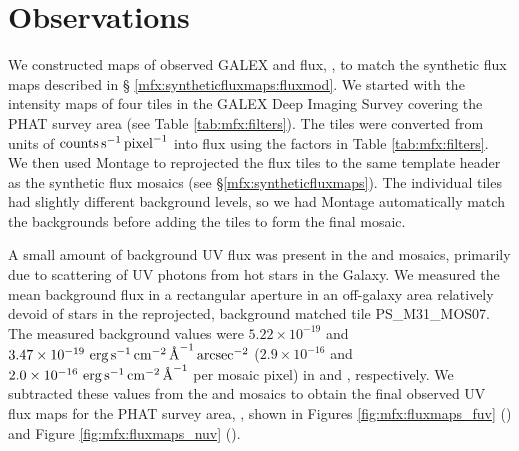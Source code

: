\section{Observations}\label{mfx:observations}

We constructed maps of observed GALEX \fuv{} and \nuv{} flux, \fxobs{}, to
match the synthetic flux maps described in \S
\ref{mfx:syntheticfluxmaps:fluxmod}. We started with the intensity maps of four
tiles in the GALEX Deep Imaging Survey \citep[DIS][]{Martin:2005} covering the
PHAT survey area (see Table \ref{tab:mfx:filters}). The tiles were converted
from units of $\mathrm{counts} \,\mathrm{s}^{-1} \,\mathrm{pixel}^{-1}$ into flux
using the factors in Table \ref{tab:mfx:filters}. We then used Montage to
reprojected the flux tiles to the same template header as the synthetic flux
mosaics (see \S \ref{mfx:syntheticfluxmaps}). The individual tiles had slightly
different background levels, so we had Montage automatically match the
backgrounds before adding the tiles to form the final mosaic.

A small amount of background UV flux was present in the \fuv{} and \nuv{}
mosaics, primarily due to scattering of UV photons from hot stars in the
Galaxy. We measured the mean background flux in a rectangular aperture in an
off-galaxy area relatively devoid of stars in the reprojected, background
matched tile PS\_M31\_MOS07. The measured background values were $5.22 \times
10^{-19}$ and $3.47 \times 10^{-19}\, \,\mathrm{erg}\,\mathrm{s}^{-1}\,\mathrm{cm}^{-2}\,\textrm{\AA}^{-1}\,\mathrm{arcsec}^{-2}$ ($2.9 \times
10^{-16}$ and $2.0 \times 10^{-16}\, \,\mathrm{erg}\,\mathrm{s}^{-1}\,\mathrm{cm}^{-2}\,\textrm{\AA}^{-1}$ per mosaic pixel) in \fuv{} and
\nuv{}, respectively. We subtracted these values from the \fuv{} and \nuv{}
mosaics to obtain the final observed UV flux maps for the PHAT survey area,
\fxobs{}, shown in Figures \ref{fig:mfx:fluxmaps_fuv} (\fuv{}) and Figure
\ref{fig:mfx:fluxmaps_nuv} (\nuv{}).


